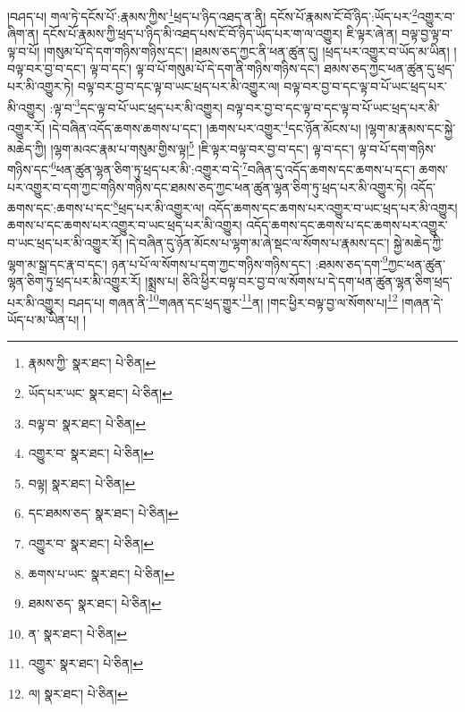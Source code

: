 །བཤད་པ། གལ་ཏེ་དངོས་པོ་:རྣམས་ཀྱིས་\footnote{རྣམས་ཀྱི་  སྣར་ཐང་།  པེ་ཅིན། }ཕྲད་པ་ཉིད་འཐད་ན་ནི། དངོས་པོ་རྣམས་ངོ་བོ་ཉིད་:ཡོད་པར་\footnote{ཡོད་པར་ཡང་  སྣར་ཐང་།  པེ་ཅིན། }འགྱུར་བ་ཞིག་ན། དངོས་པོ་རྣམས་ཀྱི་ཕྲད་པ་ཉིད་མི་འཐད་པས་ངོ་བོ་ཉིད་ཡོད་པར་ག་ལ་འགྱུར། ཇི་ལྟར་ཞེ་ན། བལྟ་བྱ་ལྟ་བ་ལྟ་བ་པོ། །གསུམ་པོ་དེ་དག་གཉིས་གཉིས་དང་། །ཐམས་ཅད་ཀྱང་ནི་ཕན་ཚུན་དུ། །ཕྲད་པར་འགྱུར་བ་ཡོད་མ་ཡིན། །བལྟ་བར་བྱ་བ་དང་། ལྟ་བ་དང་། ལྟ་བ་པོ་གསུམ་པོ་དེ་དག་ནི་གཉིས་གཉིས་དང་། ཐམས་ཅད་ཀྱང་ཕན་ཚུན་དུ་ཕྲད་པར་མི་འགྱུར་ཏེ། བལྟ་བར་བྱ་བ་དང་ལྟ་བ་ཡང་ཕྲད་པར་མི་འགྱུར་ལ། བལྟ་བར་བྱ་བ་དང་ལྟ་བ་པོ་ཡང་ཕྲད་པར་མི་འགྱུར། :ལྟ་བ་\footnote{བལྟ་བ་  སྣར་ཐང་།  པེ་ཅིན། }དང་ལྟ་བ་པོ་ཡང་ཕྲད་པར་མི་འགྱུར། བལྟ་བར་བྱ་བ་དང་ལྟ་བ་དང་ལྟ་བ་པོ་ཡང་ཕྲད་པར་མི་འགྱུར་རོ། །དེ་བཞིན་འདོད་ཆགས་ཆགས་པ་དང་། །ཆགས་པར་འགྱུར་\footnote{འགྱུར་བ་  སྣར་ཐང་།  པེ་ཅིན། }དང་ཉོན་མོངས་པ། །ལྷག་མ་རྣམས་དང་སྐྱེ་མཆེད་ཀྱི། །ལྷག་མའང་རྣམ་པ་གསུམ་གྱིས་ལྟ།\footnote{བལྟ།  སྣར་ཐང་།  པེ་ཅིན། } །ཇི་ལྟར་བལྟ་བར་བྱ་བ་དང་། ལྟ་བ་དང་། ལྟ་བ་པོ་དག་གཉིས་གཉིས་དང་\footnote{དང་ཐམས་ཅད་  སྣར་ཐང་།  པེ་ཅིན། }ཕན་ཚུན་ལྷན་ཅིག་ཏུ་ཕྲད་པར་མི་:འགྱུར་བ་དེ་\footnote{འགྱུར་བ་  སྣར་ཐང་།  པེ་ཅིན། }བཞིན་དུ་འདོད་ཆགས་དང་ཆགས་པ་དང་། ཆགས་པར་འགྱུར་བ་དག་ཀྱང་གཉིས་གཉིས་དང་ཐམས་ཅད་ཀྱང་ཕན་ཚུན་ལྷན་ཅིག་ཏུ་ཕྲད་པར་མི་འགྱུར་ཏེ། འདོད་ཆགས་དང་:ཆགས་པ་དང་\footnote{ཆགས་པ་ཡང་  སྣར་ཐང་།  པེ་ཅིན། }ཕྲད་པར་མི་འགྱུར་ལ། འདོད་ཆགས་དང་ཆགས་པར་འགྱུར་བ་ཡང་ཕྲད་པར་མི་འགྱུར། ཆགས་པ་དང་ཆགས་པར་འགྱུར་བ་ཡང་ཕྲད་པར་མི་འགྱུར། འདོད་ཆགས་དང་ཆགས་པ་དང་ཆགས་པར་འགྱུར་བ་ཡང་ཕྲད་པར་མི་འགྱུར་རོ། །དེ་བཞིན་དུ་ཉོན་མོངས་པ་ལྷག་མ་ཞེ་སྡང་ལ་སོགས་པ་རྣམས་དང་། སྐྱེ་མཆེད་ཀྱི་ལྷག་མ་སྒྲ་དང་རྣ་བ་དང་། ཉན་པ་པོ་ལ་སོགས་པ་དག་ཀྱང་གཉིས་གཉིས་དང་། :ཐམས་ཅད་དག་\footnote{ཐམས་ཅད་  སྣར་ཐང་།  པེ་ཅིན། }ཀྱང་ཕན་ཚུན་ལྷན་ཅིག་ཏུ་ཕྲད་པར་མི་འགྱུར་རོ། །སྨྲས་པ། ཅིའི་ཕྱིར་བལྟ་བར་བྱ་བ་ལ་སོགས་པ་དེ་དག་ཕན་ཚུན་ལྷན་ཅིག་ཕྲད་པར་མི་འགྱུར། བཤད་པ། གཞན་ནི་\footnote{ན་  སྣར་ཐང་།  པེ་ཅིན། }གཞན་དང་ཕྲད་གྱུར་\footnote{འགྱུར་  སྣར་ཐང་།  པེ་ཅིན། }ན། །གང་ཕྱིར་བལྟ་བྱ་ལ་སོགས་པ།\footnote{ལ།  སྣར་ཐང་།  པེ་ཅིན། } །གཞན་དེ་ཡོད་པ་མ་ཡིན་པ། །
